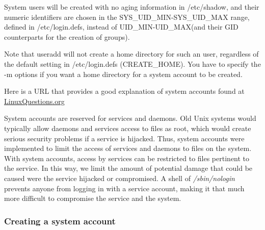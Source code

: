 \begin{addmargin}[2em]{2em}
System users will be created with no aging information in /etc/shadow, and their numeric identifiers are chosen in the SYS\_UID\_MIN-SYS\_UID\_MAX range, defined in /etc/login.defs, instead of UID\_MIN-UID\_MAX(and their GID counterparts for the creation of groups).

Note that useradd will not create a home directory for such an user, regardless of the default setting in /etc/login.defs (CREATE\_HOME). You have to specify the -m options if you want a home directory for a system account to be created.
\end{addmargin}

Here is a URL that provides a good explanation of system accounts found at \href{http://www.linuxquestions.org/questions/linux-newbie-8/useradd-r-option-and-system-account-question-892978/}{LinuxQuestions.org}

System accounts are reserved for services and daemons. Old Unix systems would typically allow daemons and services access to files as root, which would create serious security problems if a service is hijacked. Thus, system accounts were implemented to limit the access of services and daemons to files on the system. With system accounts, access by services can be restricted to files pertinent to the service. In this way, we limit the amount of potential damage that could be caused were the service hijacked or compromised. A shell of \textsl{/sbin/nologin} prevents anyone from logging in with a service account, making it that much more difficult to compromise the service and the system.

\subsubsection{Creating a system account}

